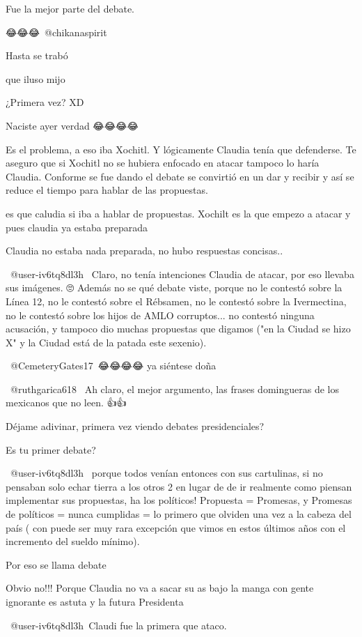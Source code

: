 Fue la mejor parte del debate.

😂😂😂​ @chikanaspirit 

Hasta se trabó

que iluso mijo

¿Primera vez? XD

Naciste ayer verdad 😂😂😂😂

Es el problema, a eso iba Xochitl. Y lógicamente Claudia tenía que defenderse. Te aseguro que si Xochitl no se hubiera enfocado en atacar tampoco lo haría Claudia. Conforme se fue dando el debate se convirtió en un dar y recibir y así se reduce el tiempo para hablar de las propuestas.

es que caludia si iba a hablar de propuestas. Xochilt es la que empezo a atacar y pues claudia ya estaba preparada

Claudia no estaba nada preparada, no hubo respuestas concisas..

 @user-iv6tq8dl3h  Claro, no tenía intenciones Claudia de atacar, por eso llevaba sus imágenes. 🙄
Además no se qué debate viste, porque no le contestó sobre la Línea 12, no le contestó sobre el Rébsamen, no le contestó sobre la Ivermectina, no le contestó sobre los hijos de AMLO corruptos... no contestó ninguna acusación, y tampoco dio muchas propuestas que digamos ("en la Ciudad se hizo X" y la Ciudad está de la patada este sexenio).

 @CemeteryGates17 😂😂😂😂 ya siéntese doña

 @ruthgarica618  Ah claro, el mejor argumento, las frases domingueras de los mexicanos que no leen. 👍👍

Déjame adivinar, primera vez viendo debates presidenciales?

Es tu primer debate?

 @user-iv6tq8dl3h  porque todos venían entonces con sus cartulinas, si no pensaban solo echar tierra a los otros 2 en lugar de de ir realmente como piensan implementar sus propuestas, ha los políticos! Propuesta = Promesas, y Promesas de políticos = nunca cumplidas = lo primero que olviden una vez a la cabeza del país ( con puede ser muy rara excepción que vimos en estos últimos años con el incremento del sueldo mínimo).

Por eso se llama debate

Obvio no!!! Porque Claudia no va a sacar su as bajo la manga con gente ignorante es astuta y la futura Presidenta 💪🏻

 @user-iv6tq8dl3h Claudi fue la primera que ataco.

